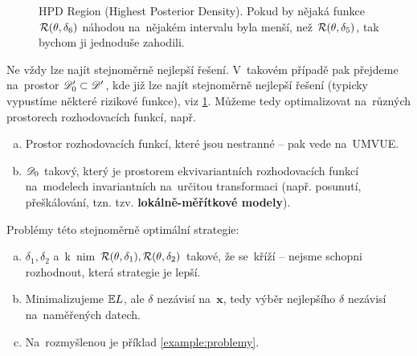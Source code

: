 	\begin{figure}[h]
		\centering
		\caption{HPD Region (Highest Posterior Density). Pokud by nějaká funkce $ \mathcal{R} (\theta, \delta_6 )
			$ náhodou na~nějakém intervalu byla menší, než $ \mathcal{R} (\theta, \delta_5 )
			$, tak bychom ji jednoduše zahodili.}\label{HPD}
	\end{figure}
	
	Ne vždy lze najít stejnoměrně nejlepší řešení. V~takovém případě pak přejdeme na~prostor $\mathscr{D}'_0\subset\mathscr{D}' $, kde již lze najít stejnoměrně nejlepší řešení (typicky vypustíme některé rizikové funkce), viz \ref{HPD}. Můžeme tedy optimalizovat na~různých prostorech rozhodovacích funkcí, např.
	\begin{enumerate}[a)]
		\item  Prostor rozhodovacích funkcí, které jsou nestranné -- pak vede na~UMVUE.
		\item $\mathscr{D} _0$ takový, který je prostorem ekvivariantních rozhodovacích funkcí na~modelech invariantních na~určitou transformaci (např. posunutí, přeškálování, tzn. tzv. \textbf{lokálně-měřítkové modely}).
	\end{enumerate}
	
	Problémy této stejnoměrně optimální strategie: \begin{enumerate}[a)]
		\item $\delta_1,\delta_2$ a~k~nim $\mathcal{R}(\theta,\delta_1),\mathcal{R}(\theta,\delta_2)$ takové, že se~kříží -- nejsme schopni rozhodnout, která strategie je lepší.
		\item Minimalizujeme $\mathbb{E} L$, ale $\delta$ nezávisí na~$\textbf{x}$, tedy výběr nejlepšího $\delta$ nezávisí na~naměřených datech.
		\item Na~rozmyšlenou je příklad \ref{example:problemy}.
	\end{enumerate}

